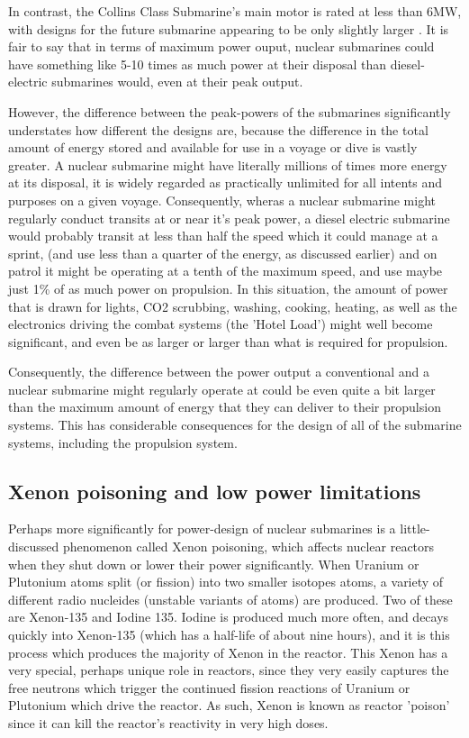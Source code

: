 \documentclass{article}\usepackage[]{graphicx}\usepackage[]{color}
\begin{document}
In contrast, the Collins Class Submarine's main motor is rated at less than 6MW, with designs for the future submarine appearing to be only slightly larger \parencite{patrick2012}.  It is fair to say that in terms of maximum power ouput, nuclear submarines could have something like 5-10 times as much power at their disposal than diesel-electric submarines would, even at their peak output.

However, the difference between the peak-powers of the submarines significantly understates how different the designs are, because the difference in the total amount of energy stored and available for use in a voyage or dive is vastly greater.  A nuclear submarine might have literally millions of times more energy at its disposal, it is widely regarded as practically unlimited for all intents and purposes on a given voyage. Consequently, wheras a nuclear submarine might regularly conduct transits at or near it's peak power, a diesel electric submarine would probably transit at less than half the speed which it could manage at a sprint, (and use less than a quarter of the energy, as discussed earlier) and on patrol it might be operating at a tenth of the maximum speed, and use maybe just 1\% of as much power on propulsion. In this situation, the amount of power that is drawn for lights, CO2 scrubbing, washing, cooking, heating, as well as the electronics driving the combat systems (the 'Hotel Load') might well become significant, and even be as larger or larger than what is required for propulsion.

Consequently, the difference between the power output a conventional and a nuclear submarine might regularly operate at could be even quite a bit larger than the maximum amount of energy that they can deliver to their propulsion systems.  This has considerable consequences for the design of all of the submarine systems, including the propulsion system.

\subsection{Xenon poisoning and low power limitations}
Perhaps more significantly for power-design of nuclear submarines is a little-discussed phenomenon called Xenon poisoning, which affects nuclear reactors when they shut down or lower their power significantly. When Uranium or Plutonium atoms split (or fission) into two smaller isotopes atoms, a variety of different radio nucleides (unstable variants of atoms) are produced.  Two of these are Xenon-135 and Iodine 135.  Iodine is produced much more often, and decays quickly into Xenon-135 (which has a half-life of about nine hours), and it is this process which produces the majority of Xenon in the reactor.  This Xenon has a very special, perhaps unique role in reactors, since they very easily captures the free neutrons which trigger the continued fission reactions of Uranium or Plutonium which drive the reactor.  As such, Xenon is known as reactor 'poison' since it can kill the reactor's reactivity in very high doses.
\end{document}
